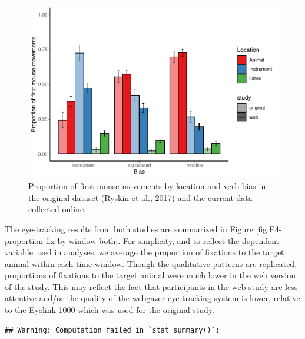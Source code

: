 \documentclass[
  man,floatsintext]{apa6}
\begin{document}
\begin{figure}
\centering
\includegraphics{manuscript_files/figure-latex/E4-mouse-moves-fig-web-and-orig-1.pdf}
\caption{\label{fig:E4-mouse-moves-fig-web-and-orig}Proportion of first mouse movements by location and verb bias in the original dataset (Ryskin et al., 2017) and the current data collected online.}
\end{figure}

The eye-tracking results from both studies are summarized in Figure \ref{fig:E4-proportion-fix-by-window-both}.
For simplicity, and to reflect the dependent variable used in analyses, we average the proportion of fixations to the target animal within each time window.
Though the qualitative patterns are replicated, proportions of fixations to the target animal were much lower in the web version of the study.
This may reflect the fact that participants in the web study are less attentive and/or the quality of the webgazer eye-tracking system is lower, relative to the Eyelink 1000 which was used for the original study.

\begin{verbatim}
## Warning: Computation failed in `stat_summary()`:
\end{verbatim}
\end{document}
